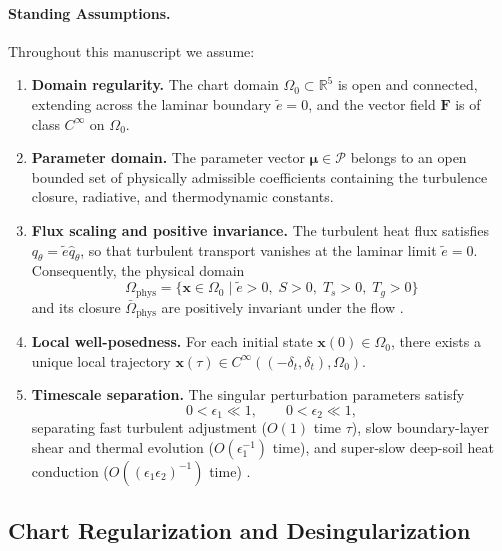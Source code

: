 \paragraph{Standing Assumptions.}
Throughout this manuscript we assume:
\begin{enumerate}
\item[\textbf{(A1)}] \textbf{Domain regularity.} The chart domain $\Omega_0 \subset \mathbb{R}^5$ is open and connected, extending across the laminar boundary $\tilde e = 0$, and the vector field $\mathbf{F}$ is of class $C^\infty$ on $\Omega_0$.
\item[\textbf{(A2)}] \textbf{Parameter domain.} The parameter vector $\boldsymbol{\mu} \in \mathcal{P}$ belongs to an open bounded set of physically admissible coefficients containing the turbulence closure, radiative, and thermodynamic constants.
\item[\textbf{(A3)}] \textbf{Flux scaling and positive invariance.} The turbulent heat flux satisfies $q_\theta = \tilde e \hat q_\theta$, so that turbulent transport vanishes at the laminar limit $\tilde e = 0$. Consequently, the physical domain
\begin{equation}
\Omega_{\mathrm{phys}} = \{\mathbf{x} \in \Omega_0 \mid \tilde e > 0,\; S > 0,\; T_s > 0,\; T_g > 0\}
\end{equation}
and its closure $\bar\Omega_{\mathrm{phys}}$ are positively invariant under the flow \citep{vanDeWiel2017}.
\item[\textbf{(A4)}] \textbf{Local well-posedness.} For each initial state $\mathbf{x}(0) \in \Omega_0$, there exists a unique local trajectory $\mathbf{x}(\tau) \in C^\infty((-\delta_t, \delta_t), \Omega_0)$.
\item[\textbf{(A5)}] \textbf{Timescale separation.} The singular perturbation parameters satisfy
\begin{equation}
0 < \epsilon_1 \ll 1, \qquad 0 < \epsilon_2 \ll 1,
\end{equation}
separating fast turbulent adjustment ($O(1)$ time $\tau$), slow boundary-layer shear and thermal evolution ($O(\epsilon_1^{-1})$ time), and super-slow deep-soil heat conduction ($O((\epsilon_1\epsilon_2)^{-1})$ time) \citep{Kuehn2015, Kristiansen2024}.
\end{enumerate}

\subsection{Chart Regularization and Desingularization}

